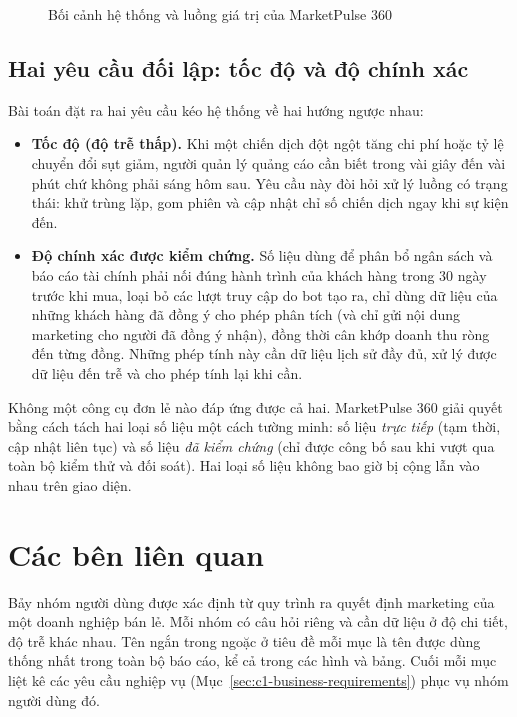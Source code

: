 \begin{figure}[H]
    \centering
    \resizebox{\textwidth}{!}{}
    \caption{Bối cảnh hệ thống và luồng giá trị của MarketPulse 360}
    \label{fig:system-context}
\end{figure}

\subsection{Hai yêu cầu đối lập: tốc độ và độ chính xác}
\label{sec:c1-hai-yeu-cau}

Bài toán đặt ra hai yêu cầu kéo hệ thống về hai hướng ngược nhau:

\begin{itemize}
    \item \textbf{Tốc độ (độ trễ thấp).} Khi một chiến dịch đột ngột tăng chi phí hoặc tỷ lệ chuyển đổi sụt giảm, người quản lý quảng cáo cần biết trong vài giây đến vài phút chứ không phải sáng hôm sau. Yêu cầu này đòi hỏi xử lý luồng có trạng thái: khử trùng lặp, gom phiên và cập nhật chỉ số chiến dịch ngay khi sự kiện đến.
    \item \textbf{Độ chính xác được kiểm chứng.} Số liệu dùng để phân bổ ngân sách và báo cáo tài chính phải nối đúng hành trình của khách hàng trong 30 ngày trước khi mua, loại bỏ các lượt truy cập do bot tạo ra, chỉ dùng dữ liệu của những khách hàng đã đồng ý cho phép phân tích (và chỉ gửi nội dung marketing cho người đã đồng ý nhận), đồng thời cân khớp doanh thu ròng đến từng đồng. Những phép tính này cần dữ liệu lịch sử đầy đủ, xử lý được dữ liệu đến trễ và cho phép tính lại khi cần.
\end{itemize}

Không một công cụ đơn lẻ nào đáp ứng được cả hai. MarketPulse 360 giải quyết bằng cách tách hai loại số liệu một cách tường minh: số liệu \emph{trực tiếp} (tạm thời, cập nhật liên tục) và số liệu \emph{đã kiểm chứng} (chỉ được công bố sau khi vượt qua toàn bộ kiểm thử và đối soát). Hai loại số liệu không bao giờ bị cộng lẫn vào nhau trên giao diện.

\section{Các bên liên quan}
\label{sec:c1-stakeholders}

Bảy nhóm người dùng được xác định từ quy trình ra quyết định marketing của một doanh nghiệp bán lẻ. Mỗi nhóm có câu hỏi riêng và cần dữ liệu ở độ chi tiết, độ trễ khác nhau. Tên ngắn trong ngoặc ở tiêu đề mỗi mục là tên được dùng thống nhất trong toàn bộ báo cáo, kể cả trong các hình và bảng. Cuối mỗi mục liệt kê các yêu cầu nghiệp vụ (Mục~\ref{sec:c1-business-requirements}) phục vụ nhóm người dùng đó.

